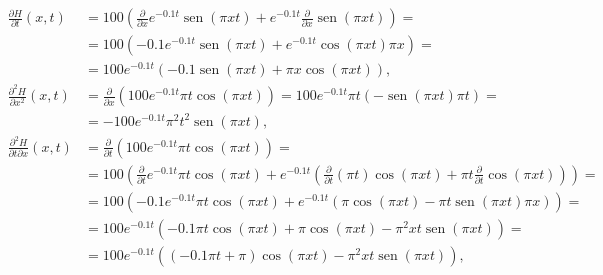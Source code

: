 \documentclass[
  spanish,
  a4paper,
]{scrreport}
\theoremstyle{definition}
\theoremstyle{remark}
\begin{document}
\begin{tcolorbox}
\begin{enumerate}
  \begin{align*}
  \frac{\partial H}{\partial t} (x,t) &= 100\left(\frac{\partial}{\partial x} e^{-0.1 t} \operatorname{sen} (\pi xt) + e^{-0.1t}\frac{\partial}{\partial x}\operatorname{sen}(\pi xt)\right)=\\
  &= 100\left(-0.1e^{-0.1t}\operatorname{sen}(\pi xt) +e^{-0.1t}\cos(\pi xt)\pi x\right) =\\
  &= 100 e^{-0.1t}\left(-0.1 \operatorname{sen}(\pi xt) + \pi x \cos(\pi xt)\right),\\
  \frac{\partial^2 H}{\partial x^2}(x,t) &= \frac{\partial}{\partial x}\left(100e^{-0.1t}\pi t\cos(\pi xt) \right) = 100e^{-0.1t}\pi t(-\operatorname{sen}(\pi xt) \pi t) =\\
  &= -100e^{-0.1t}\pi^2 t^2\operatorname{sen}(\pi xt),\\
  \frac{\partial^2 H}{\partial t\partial x}(x,t) &= \frac{\partial}{\partial t}\left(100e^{-0.1t}\pi t\cos(\pi xt) \right) =\\
  &= 100\left(\frac{\partial}{\partial t}e^{-0.1t}\pi t\cos(\pi xt) + e^{-0.1t}\left(\frac{\partial}{\partial t}(\pi t)\cos(\pi xt) + \pi t \frac{\partial}{\partial t}\cos(\pi xt)\right) \right) =\\
  &= 100\left(-0.1e^{-0.1t}\pi t\cos(\pi xt) + e^{-0.1t}\left(\pi \cos(\pi xt) - \pi t \operatorname{sen}(\pi xt)\pi x\right) \right) =\\
  &= 100e^{-0.1t}\left(-0.1\pi t\cos(\pi xt)+\pi \cos(\pi xt) - \pi^2 xt \operatorname{sen}(\pi xt)\right) = \\
  &= 100e^{-0.1t}\left((-0.1\pi t+\pi)\cos(\pi xt) - \pi^2 xt \operatorname{sen}(\pi xt)\right),\\
  \end{align*}


\end{enumerate}
\end{tcolorbox}
\end{document}
